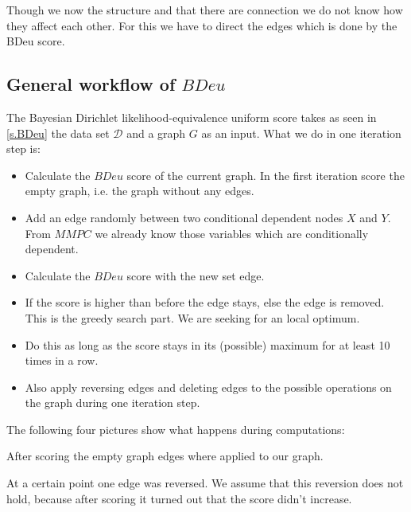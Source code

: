 			 \label{img.skeleton}

			Though we now the structure and that there are connection we do not know how they affect each other. For this we have to direct the edges which is done by the BDeu score.

		\subsection{General workflow of $BDeu$}

			The Bayesian Dirichlet likelihood-equivalence uniform score takes as seen in \autoref{s.BDeu} the data set $\mathcal{D}$ and a graph $G$ as an input. What we do in one iteration step is:

			\begin{itemize}
				\item Calculate the $BDeu$ score of the current graph. In the first iteration score the empty graph, i.e. the graph without any edges.
				\item Add an edge randomly between two conditional dependent nodes $X$ and $Y$. From $MMPC$ we already know those variables which are conditionally dependent.
				\item Calculate the $BDeu$ score with the new set edge.
				\item If the score is higher than before the edge stays, else the edge is removed. This is the greedy search part. We are seeking for an local optimum.
				\item Do this as long as the score stays in its (possible) maximum for at least 10 times in a row.
				\item Also apply reversing edges and deleting edges to the possible operations on the graph during one iteration step.
			\end{itemize}

			The following four pictures show what happens during computations:

			 \label{img.empty}

			After scoring the empty graph edges where applied to our graph.
			 \label{img.add}

			At a certain point one edge was reversed. We assume that this reversion does not hold, because after scoring it turned out that the score didn't increase.
			 \label{img.reverse}

